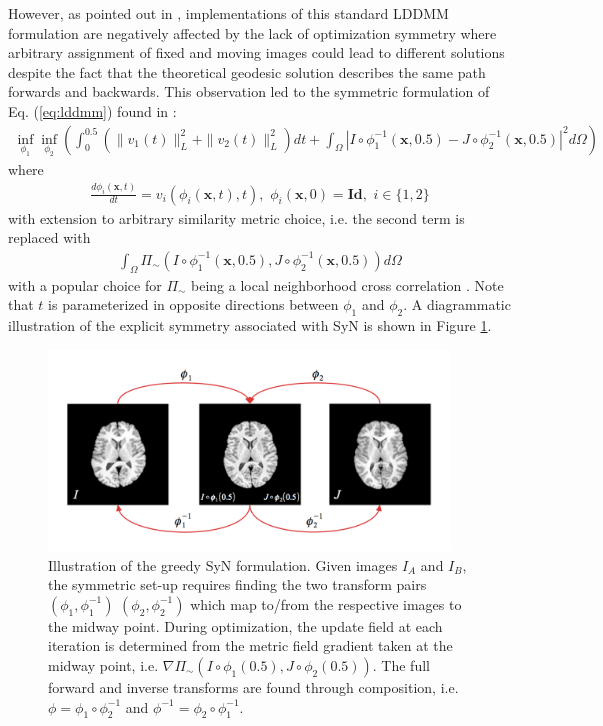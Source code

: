 \documentclass{frontiersSCNS}
\begin{document}
However,
as pointed out in \cite{avants2008}, implementations of this standard
LDDMM formulation are negatively affected by the lack of optimization
symmetry where arbitrary assignment of fixed and moving images could
lead to different solutions despite the fact that the theoretical
geodesic solution describes the same path forwards and backwards.
This observation led to the symmetric
formulation of Eq. (\ref{eq:lddmm}) found in \cite{avants2008}:
\begin{align}
  \inf_{\phi_1} \inf_{\phi_2} \left(
                     \int_0^{0.5} \left( \|v_1(t)\|_L^2 + \|v_2(t)\|_L^2 \right) dt +
                     \int_{\Omega} | I \circ \phi_1^{-1}(\mathbf{x},0.5)
                           - J \circ \phi_2^{-1}(\mathbf{x},0.5) |^2 d\Omega
              \right)
\end{align}
where
\begin{align}
  \frac{d \phi_i(\mathbf{x},t)}{dt} = v_i( \phi_i(\mathbf{x},t), t ),\,\, \phi_i(\mathbf{x},0) = \mathbf{Id}, \,\, i \in \{1,2\}
\end{align}
with extension to arbitrary similarity metric choice, i.e. the second
term is replaced with
\begin{align}
\int_{\Omega} \Pi_{\sim}
                          \left( I \circ \phi_1^{-1}(\mathbf{x},0.5),
                           J \circ \phi_2^{-1}(\mathbf{x},0.5) \right) d\Omega
\end{align}
with a popular choice for $\Pi_{\sim}$ being a local neighborhood cross
correlation \citep{avants2008,avants2011}.
Note that
$t$ is parameterized in opposite directions between $\phi_1$ and $\phi_2$.
A diagrammatic
illustration of the explicit symmetry associated with SyN is shown in
Figure \ref{fig:syn}.

\begin{figure}[htb]
  \centering
  \includegraphics[width=0.95\textwidth]{SyN.jpg}
  \caption{Illustration of the greedy SyN formulation.  Given images
  $I_A$ and $I_B$, the symmetric set-up requires finding the two
  transform pairs $\left(\phi_1,\phi_1^{-1}\right)$
  $\left(\phi_2,\phi_2^{-1}\right)$ which map to/from
  the respective images to the midway point. During
  optimization, the update field at each iteration is
  determined from the metric field gradient taken at
  the midway point, i.e.
  $\nabla \Pi_{\sim} \left(I\circ\phi_1(0.5),J\circ\phi_2(0.5)\right)$.
  The full
  forward and inverse transforms are found through
  composition, i.e. $\phi=\phi_1 \circ \phi_2^{-1}$ and
  $\phi^{-1}=\phi_2 \circ \phi_1^{-1}$.
  }
  \label{fig:syn}
\end{figure}
\end{document}
